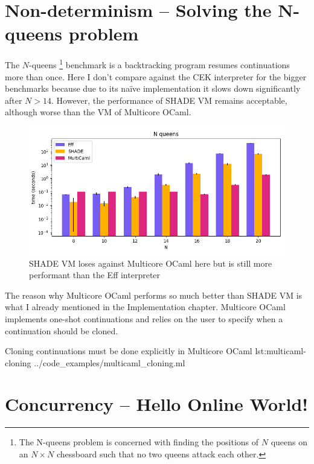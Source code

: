 \documentclass[class=article, crop=false]{standalone}
\begin{document}
\section{Non-determinism -- Solving the N-queens problem}

The $N$-queens
\footnote{The N-queens problem is concerned with finding the positions of $N$ queens on an $N \times N$ chessboard
such that no two queens attack each other.}
benchmark is a backtracking program resumes continuations more than once. Here I don't compare against the CEK interpreter
for the bigger benchmarks because due to its naïve implementation it slows down significantly after $N > 14$.
However, the performance of SHADE VM remains acceptable, although worse than the VM of Multicore OCaml.

\begin{figure}
    \centering
    \includegraphics[width=35em]{eval_plots/comp_queens.png}
    \caption{SHADE VM loses against Multicore OCaml here but is still more performant than the Eff interpreter}
    \label{fig:n-queens}
\end{figure}

The reason why Multicore OCaml performs so much better than SHADE VM is what I already mentioned in the Implementation chapter. Multicore OCaml
implements one-shot continuations and relies on the user to specify when a continuation should be cloned.

{Cloning continuations must be done explicitly in Multicore OCaml}
{lst:multicaml-cloning}
{../code_examples/multicaml_cloning.ml}

\section{Concurrency -- Hello Online World!}
\end{document}
